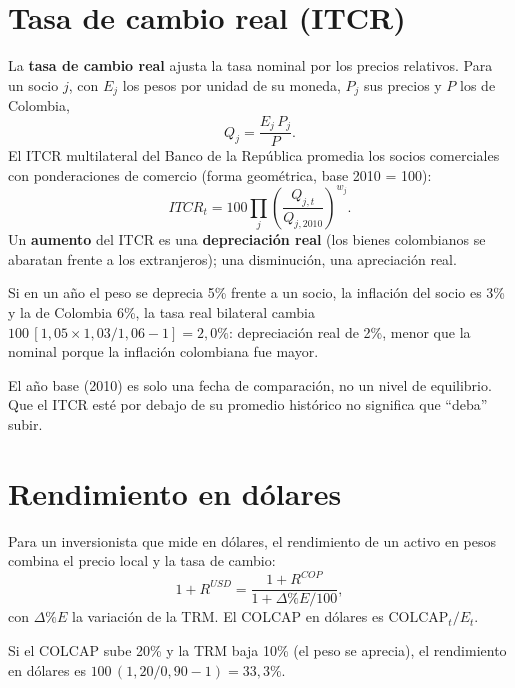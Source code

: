 \section{Tasa de cambio real (ITCR)}
\label{es:f:itcr}
La \textbf{tasa de cambio real} ajusta la tasa nominal por los precios relativos. Para un socio $j$, con $E_j$ los
pesos por unidad de su moneda, $P_j$ sus precios y $P$ los de Colombia,
\[
Q_j=\frac{E_j\,P_j}{P}.
\]
El ITCR multilateral del Banco de la República promedia los socios comerciales con ponderaciones de comercio
(forma geométrica, base 2010 = 100):
\[
ITCR_t=100\prod_j\left(\frac{Q_{j,t}}{Q_{j,2010}}\right)^{w_j}.
\]
Un \textbf{aumento} del ITCR es una \textbf{depreciación real} (los bienes colombianos se abaratan frente a los
extranjeros); una disminución, una apreciación real.

\begin{dato}
Si en un año el peso se deprecia 5\% frente a un socio, la inflación del socio es 3\% y la de Colombia 6\%, la tasa real
bilateral cambia $100\,[1{,}05\times1{,}03/1{,}06-1]=2{,}0\%$: depreciación real de 2\%, menor que la nominal porque
la inflación colombiana fue mayor.
\end{dato}

\begin{alerta}
El año base (2010) es solo una fecha de comparación, no un nivel de equilibrio. Que el ITCR esté por debajo de su
promedio histórico no significa que ``deba'' subir.
\end{alerta}

\section{Rendimiento en dólares}
\label{es:f:usd}
Para un inversionista que mide en dólares, el rendimiento de un activo en pesos combina el precio local y la tasa de
cambio:
\[
1+R^{USD}=\frac{1+R^{COP}}{1+\Delta\%E/100},
\]
con $\Delta\%E$ la variación de la TRM. El COLCAP en dólares es $\text{COLCAP}_t/E_t$.

\begin{dato}
Si el COLCAP sube 20\% y la TRM baja 10\% (el peso se aprecia), el rendimiento en dólares es
$100\,(1{,}20/0{,}90-1)=33{,}3\%$.
\end{dato}

